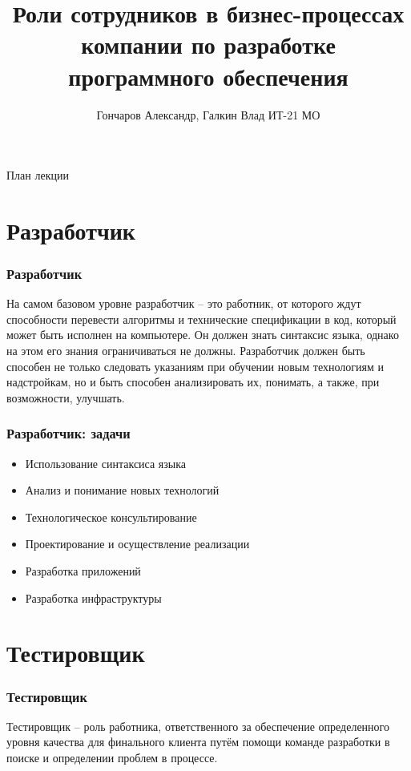 \documentclass{../industrial-development}
\title{Роли сотрудников в бизнес-процессах компании по разработке программного обеспечения}
\author{Гончаров Александр, Галкин Влад ИТ-21 МО}
\date{}
\begin{document}
	
	\begin{frame}
		\titlepage
	\end{frame}
	
	\begin{frame}{План лекции}
		\tableofcontents
	\end{frame}
	
	
	\section{Разработчик }
	
	\begin{frame} \frametitle{Разработчик}
		\begin{block}{}
			\alert {}На самом базовом уровне разработчик – это работник, от которого ждут способности перевести алгоритмы и технические спецификации в код, который может быть исполнен на компьютере. Он должен знать синтаксис языка, однако на этом его знания ограничиваться не должны. Разработчик должен быть способен не только следовать указаниям при обучении новым технологиям и надстройкам, но и быть способен анализировать их, понимать, а также, при возможности, улучшать.
			
		\end{block}
		
	\end{frame}
	
	\begin{frame} \frametitle{Разработчик: задачи}
		\begin{itemize}
			\item Использование синтаксиса языка
			\item Анализ и понимание новых технологий
			\item Технологическое консультирование
			\item Проектирование и осуществление реализации
			\item Разработка приложений
			\item Разработка инфраструктуры
		\end{itemize}
	\end{frame}
	
	\section{Тестировщик }
	
	\begin{frame} \frametitle{Тестировщик}
		\begin{block}{}
			\alert {Тестировщик} – роль работника, ответственного за обеспечение определенного уровня качества для финального клиента путём помощи команде разработки в поиске и определении проблем в процессе.
		\end{block}
		
	\end{frame}
	
\end{document}

